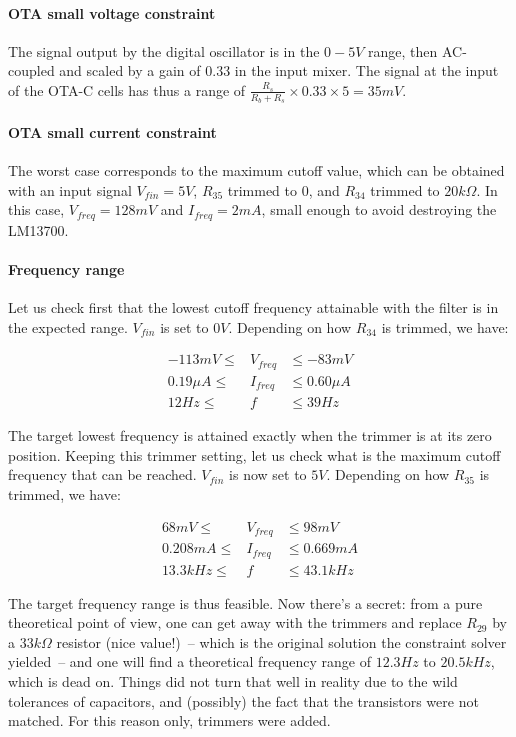 \documentclass[a4paper,11pt]{article}
\begin{document}
\paragraph{OTA small voltage constraint} The signal output by the digital oscillator is in the $0-5V$ range, then AC-coupled and scaled by a gain of $0.33$ in the input mixer. The signal at the input of the OTA-C cells has thus a range of $\frac{R_s}{R_b + R_s} \times 0.33 \times 5 = 35mV$.

\paragraph{OTA small current constraint} The worst case corresponds to the maximum cutoff value, which can be obtained with an input signal $V_{fin} = 5V$, $R_{35}$ trimmed to 0, and $R_{34}$ trimmed to $20k\Omega$. In this case, $V_{freq} = 128mV$ and $I_{freq} = 2mA$, small enough to avoid destroying the LM13700.

\paragraph{Frequency range} Let us check first that the lowest cutoff frequency attainable with the filter is in the expected range. $V_{fin}$ is set to $0V$. Depending on how $R_{34}$ is trimmed, we have:

\begin{eqnarray}
-113mV \leq &V_{freq}& \leq -83mV \\
0.19\mu A \leq &I_{freq}& \leq 0.60\mu A \\
12Hz \leq &f& \leq 39Hz
\end{eqnarray}

The target lowest frequency is attained exactly when the trimmer is at its zero position. Keeping this trimmer setting, let us check what is the maximum cutoff frequency that can be reached. $V_{fin}$ is now set to $5V$. Depending on how $R_{35}$ is trimmed, we have:

\begin{eqnarray}
68mV \leq &V_{freq}& \leq 98mV \\
0.208 mA \leq &I_{freq}& \leq 0.669 mA \\
13.3kHz \leq &f& \leq 43.1kHz
\end{eqnarray}

The target frequency range is thus feasible. Now there's a secret: from a pure theoretical point of view, one can get away with the trimmers and replace $R_{29}$ by a $33k\Omega$ resistor (nice value!)~-- which is the original solution the constraint solver yielded~-- and one will find a theoretical frequency range of $12.3 Hz$ to $20.5kHz$, which is dead on. Things did not turn that well in reality due to the wild tolerances of capacitors, and (possibly) the fact that the transistors were not matched. For this reason only, trimmers were added.
\end{document}

